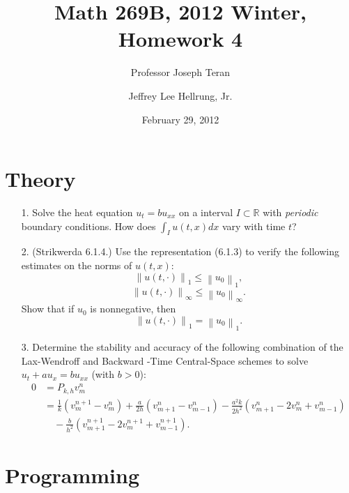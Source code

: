 \documentclass{article}
\providecommand{\norm}[1]{\left\lVert#1\right\rVert}
\begin{document}
\title{Math 269B, 2012 Winter, Homework 4}
\date{February 29, 2012}
\author{Professor Joseph Teran \and Jeffrey Lee Hellrung, Jr.}
\maketitle

\section{Theory}

\begin{itemize}

\item[1.] Solve the heat equation $u_t = b u_{xx}$ on a interval $I \subset \mathbb{R}$ with \emph{periodic} boundary conditions. How does $\int_I u(t,x) dx$ vary with time $t$?

\item[2.] (Strikwerda 6.1.4.) Use the representation (6.1.3) to verify the following estimates on the norms of $u(t,x)$:
\begin{equation*}
\norm{u(t,\cdot)}_1 \leq \norm{u_0}_1,
\end{equation*}
\begin{equation*}
\norm{u(t,\cdot)}_{\infty} \leq \norm{u_0}_{\infty}.
\end{equation*}
Show that if $u_0$ is nonnegative, then
\begin{equation*}
\norm{u(t,\cdot)}_1 = \norm{u_0}_1.
\end{equation*}

\item[3.] Determine the stability and accuracy of the following combination of the Lax-Wendroff and Backward -Time Central-Space schemes to solve $u_t + a u_x = b u_{xx}$ (with $b > 0$):
\begin{align*}
0 & = P_{k,h} v^n_m \\
  & = \frac{1}{k} \left( v^{n+1}_m - v^n_m \right) + \frac{a}{2h} \left( v^n_{m+1} - v^n_{m-1} \right) - \frac{a^2k}{2h^2} \left( v^n_{m+1} - 2 v^n_m + v^n_{m-1} \right) \\
  & \quad {} - \frac{b}{h^2} \left( v^{n+1}_{m+1} - 2 v^{n+1}_m + v^{n+1}_{m-1} \right).
\end{align*}

\end{itemize}

\section{Programming}
\end{document}
